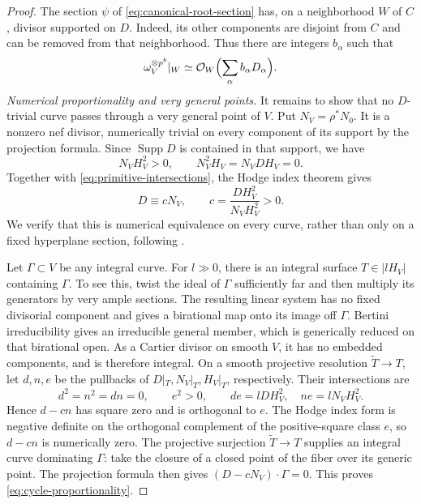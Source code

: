 \begin{proof}
The section $\psi$ of \eqref{eq:canonical-root-section} has, on
a neighborhood $W$ of $C$, divisor supported on $D$.  Indeed, its
other components are disjoint from $C$ and can be removed from
that neighborhood.  Thus there are integers $b_\alpha$ such that
\begin{equation}\label{eq:prepared-canonical-relation}
 \omega_V^{\otimes p^b}|_W
     \simeq\mathcal O_W\Bigl(\sum_\alpha b_\alpha D_\alpha\Bigr).
\end{equation}
\emph{Numerical proportionality and very general points.}
It remains to show that no $D$-trivial curve passes through a very
general point of $V$.  Put $N_V=\rho^*N_0$.  It is a nonzero nef
divisor, numerically trivial on every component of its support by
the projection formula.  Since $\operatorname{Supp}D$ is contained
in that support, we have
\[
 N_VH_V^2>0,\qquad N_V^2H_V=N_VDH_V=0.
\]
Together with \eqref{eq:primitive-intersections}, the Hodge index
theorem gives
\begin{equation}\label{eq:cycle-proportionality}
 D\equiv cN_V,\qquad
 c=\frac{DH_V^2}{N_VH_V^2}>0.
\end{equation}
We verify that this is numerical equivalence on every curve, rather
than only on a fixed hyperplane section, following
\cite[Section~2.8]{Companion}.

Let $\Gamma\subset V$ be any integral curve.  For $l\gg0$, there
is an integral surface $T\in|lH_V|$ containing $\Gamma$.  To see
this, twist the ideal of $\Gamma$ sufficiently far and then multiply
its generators by very ample sections.  The resulting linear system
has no fixed divisorial component and gives a birational map onto
its image off $\Gamma$.  Bertini irreducibility gives an irreducible
general member, which is generically reduced on that birational open.
As a Cartier divisor on smooth $V$, it has no embedded components,
and is therefore integral.
On a smooth projective resolution $\widetilde T\to T$,
let $d,n,e$ be the pullbacks of $D|_T,N_V|_T,H_V|_T$, respectively.
Their intersections are
\[
 d^2=n^2=dn=0,\qquad e^2>0,\qquad
 de=lDH_V^2,\quad ne=lN_VH_V^2.
\]
Hence $d-cn$ has square zero and is orthogonal to $e$.  The
Hodge index form is negative definite on the orthogonal complement
of the positive-square class $e$, so $d-cn$ is numerically zero.
The projective surjection $\widetilde T\to T$ supplies an integral
curve dominating $\Gamma$: take the closure of a closed point of
the fiber over its generic point.  The projection formula then gives
$(D-cN_V)\cdot\Gamma=0$.  This proves
\eqref{eq:cycle-proportionality}.


\end{proof}

